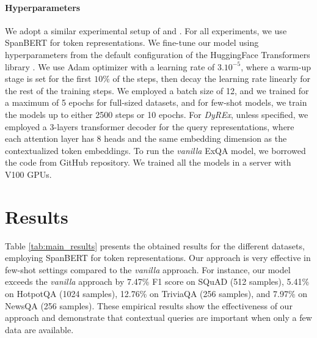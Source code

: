 \documentclass{article}
\begin{document}
\paragraph{Hyperparameters} We adopt a similar experimental setup of \citet{few_shot_QA} and \citet{span_BERT}. For all experiments, we use SpanBERT for token representations. We fine-tune our model using hyperparameters from the default configuration of the HuggingFace Transformers library \citep{transformers}. We use Adam optimizer with a learning rate of $3 . 10^{-5}$, where a warm-up stage is set for the first $ 10\%$ of the steps, then decay the learning rate linearly for the rest of the training steps. We employed a batch size of 12, and we trained for a maximum of 5 epochs for full-sized datasets, and for few-shot models, we train the models up to either 2500 steps or 10 epochs. For \textit{DyREx}, unless specified, we employed a 3-layers transformer decoder for the query representations, where each attention layer has 8 heads and the same embedding dimension as the contextualized token embeddings. To run the \textit{vanilla} ExQA model, we borrowed the code from \citep{few_shot_QA} GitHub repository. We trained all the models in a server with V100 GPUs.



\section{Results}
\label{sec:results}

Table \ref{tab:main_results} presents the obtained results for the different datasets, employing SpanBERT for token representations.
Our approach is very effective in few-shot settings compared to the \textit{vanilla} approach. For instance, our model exceeds the \textit{vanilla} approach by 7.47\% F1 score on SQuAD (512 samples), 5.41\% on HotpotQA (1024 samples), 12.76\% on TriviaQA (256 samples), and 7.97\% on NewsQA (256 samples). These empirical results show the effectiveness of our approach and demonstrate that contextual queries are important when only a few data are available.
\end{document}
